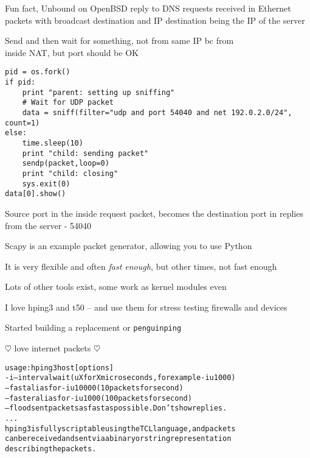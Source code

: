 \documentclass[Screen16to9,17pt]{foils}
\begin{document}
{\footnotesize Fun fact, Unbound on OpenBSD reply to DNS requests received in Ethernet packets with broadcast destination and IP destination being the IP of the server}




Send and then wait for something, not from same IP bc from\\
inside NAT, but port should be OK
\begin{verbatim}
pid = os.fork()
if pid:
    print "parent: setting up sniffing"
    # Wait for UDP packet
    data = sniff(filter="udp and port 54040 and net 192.0.2.0/24", count=1)
else:
    time.sleep(10)
    print "child: sending packet"
    sendp(packet,loop=0)
    print "child: closing"
    sys.exit(0)
data[0].show()
\end{verbatim}

Source port in the inside request packet, becomes the destination port in replies from the server - 54040




\begin{list2}
\item Scapy is an example packet generator, allowing you to use Python
\item It is very flexible and often \emph{fast enough}, but other times, not fast enough
\item Lots of other tools exist, some work as kernel modules even
\item I love hping3 and t50 -- and use them for stress testing firewalls and devices
\item Started building a replacement or \verb+penguinping+
\end{list2}
\centerline{\Large $\heartsuit$ love internet packets $\heartsuit$}



\begin{alltt}\footnotesize
usage: hping3 host [options]
  -i  --interval  wait (uX for X microseconds, for example -i u1000)
      --fast      alias for -i u10000 (10 packets for second)
      --faster    alias for -i u1000 (100 packets for second)
      --flood	   sent packets as fast as possible. Don't show replies.
...
hping3 is fully scriptable using the TCL language, and packets
can be received and sent via a binary or string representation
describing the packets.
\end{alltt}
\end{document}

